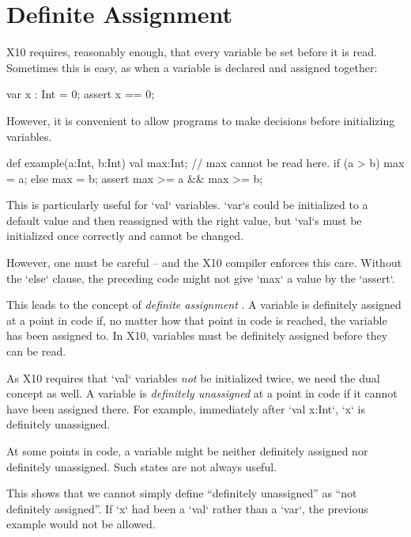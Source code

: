 \chapter{Definite Assignment}
\label{sect:DefiniteAssignment}

X10 requires, reasonably enough, that every variable be set before it is read.
Sometimes this is easy, as when a variable is declared and assigned together: 
\begin{xten}
  var x : Int = 0;
  assert x == 0;
\end{xten}
However, it is convenient to allow programs to make decisions before
initializing variables.
\begin{xten}
def example(a:Int, b:Int) {
  val max:Int;
  // max cannot be read here.
  if (a > b) max = a;
  else max = b;
  assert max >= a && max >= b;
}
\end{xten}
This is particularly useful for \xcd`val` variables.  \xcd`var`s could be
initialized to a default value and then reassigned with the right value, but
\xcd`val`s must be initialized once correctly and cannot be changed. 

However, one must be careful -- and the X10 compiler enforces this care.
Without the \xcd`else` clause, the preceding code might not give \xcd`max` a
value by the \xcd`assert`.  

This leads to the concept of {\em definite assignment} \cite{Javasomething}.
A variable is definitely assigned at a point in code if, no matter how that
point in code is reached, the variable has been assigned to.  In X10,
variables must be definitely assigned before they can be read.


As X10 requires that \xcd`val` variables {\em not} be initialized
twice,  we need the dual concept as well.  A variable is {\em definitely
unassigned} at a point in code if it cannot have been assigned there.  For
example, immediately after \xcd`val x:Int`, \xcd`x` is definitely unassigned.  

At some points in code, a variable might be neither definitely assigned nor
definitely unassigned.    Such states are not always useful.  
% 
\begin{xten}
def example(flag : Boolean) {
  var x : Int;
  if (flag) x = 1;
  // x is neither def. assigned nor unassigned.
  x = 2; 
  // x is def. assigned.
\end{xten}
This shows that we cannot simply define ``definitely unassigned'' as ``not
definitely assigned''.   If \xcd`x` had been a \xcd`val` rather than a
\xcd`var`, the previous example would not be allowed.  


